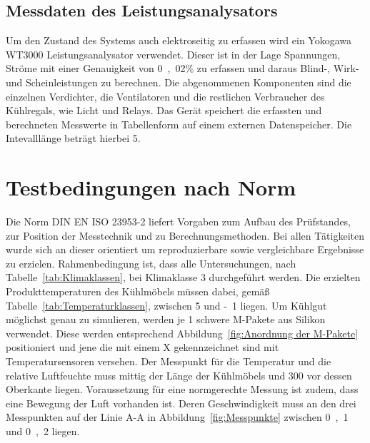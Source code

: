 \subsection{Messdaten des Leistungsanalysators}
\label{subsec:Messdaten des Leistungsanalysators}

Um den Zustand des Systems auch elektroseitig zu erfassen wird ein Yokogawa WT3000 Leistungsanalysator verwendet. Dieser ist in der Lage Spannungen, Ströme mit einer Genauigkeit von \unit{0,02}{\%} zu erfassen und daraus Blind-, Wirk- und Scheinleistungen zu berechnen. Die abgenommenen Komponenten sind die einzelnen Verdichter, die Ventilatoren und die restlichen Verbraucher des Kühlregals, wie Licht und Relays.
Das Gerät speichert die erfassten und berechneten Messwerte in Tabellenform auf einem externen Datenspeicher. Die Intevalllänge beträgt hierbei \unit{5}{\second}.


\section{Testbedingungen nach Norm}
\label{sec:Testbedingungen nach Norm}

Die Norm DIN EN ISO 23953-2 liefert Vorgaben zum Aufbau des Prüfstandes, zur Position der Messtechnik und zu Berechnungsmethoden. Bei allen Tätigkeiten wurde sich an dieser orientiert um reproduzierbare sowie vergleichbare Ergebnisse zu erzielen. Rahmenbedingung ist, dass alle Untersuchungen, nach Tabelle~\ref{tab:Klimaklassen}, bei Klimaklasse 3 durchgeführt werden. Die erzielten Produkttemperaturen des Kühlmöbels müssen dabei, gemäß Tabelle~\ref{tab:Temperaturklassen}, zwischen \unit{5}{\celsius} und \unit{-1}{\celsius} liegen.
Um Kühlgut möglichst genau zu simulieren, werden je \unit{1}{\kilogram} schwere M-Pakete aus Silikon verwendet.
Diese werden entsprechend Abbildung~\ref{fig:Anordnung der M-Pakete} positioniert und jene die mit einem X gekennzeichnet sind mit Temperatursensoren versehen.
Der Messpunkt für die Temperatur und die relative Luftfeuchte muss mittig der Länge der Kühlmöbels und \unit{300}{\milli\metre} vor dessen Oberkante liegen.
Voraussetzung für eine normgerechte Messung ist zudem, dass eine Bewegung der Luft vorhanden ist. Deren Geschwindigkeit muss an den drei Messpunkten auf der Linie A-A in Abbildung~\ref{fig:Messpunkte} zwischen \unit{0,1}{\meter\per\second} und \unit{0,2}{\meter\per\second} liegen\cite{DINDeutschesInstitutfurNormunge.V..}.







